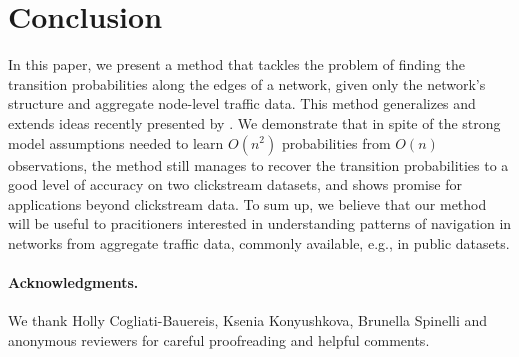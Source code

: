 \section{Conclusion}  %
\label{cr:sec:conclusion}

In this paper, we present a method that tackles the problem of finding the transition probabilities along the edges of a network, given only the network's structure and aggregate node-level traffic data.
This method generalizes and extends ideas recently presented by \citet{kumar2015inverting}.
We demonstrate that in spite of the strong model assumptions needed to learn $O(n^2)$ probabilities from $O(n)$ observations, the method still manages to recover the transition probabilities to a good level of accuracy on two clickstream datasets, and shows promise for applications beyond clickstream data.
To sum up, we believe that our method will be useful to pracitioners interested in understanding patterns of navigation in networks from aggregate traffic data, commonly available, e.g., in public datasets.

\paragraph{Acknowledgments.}
We thank Holly Cogliati-Bauereis, Ksenia Konyushkova, Brunella Spinelli and anonymous reviewers for careful proofreading and helpful comments.
